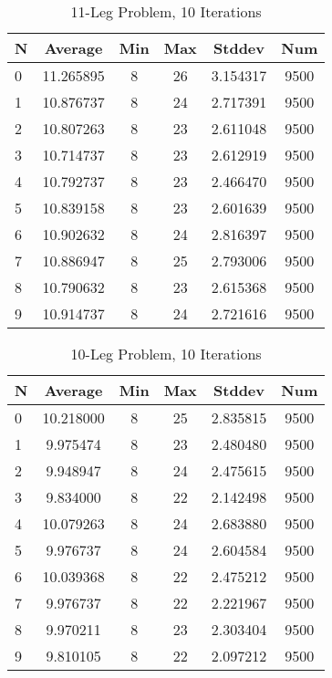 \documentclass{article}
\begin{document}
\begin{table}
\centering
\begin{tabular}{|l|c|c|c|c|c|}
\hline
N & Average & Min & Max & Stddev & Num \\
\hline
0 & 11.265895 & 8 & 26 & 3.154317 & 9500 \\ 
1 & 10.876737 & 8 & 24 & 2.717391 & 9500 \\ 
2 & 10.807263 & 8 & 23 & 2.611048 & 9500 \\ 
3 & 10.714737 & 8 & 23 & 2.612919 & 9500 \\ 
4 & 10.792737 & 8 & 23 & 2.466470 & 9500 \\ 
5 & 10.839158 & 8 & 23 & 2.601639 & 9500 \\ 
6 & 10.902632 & 8 & 24 & 2.816397 & 9500 \\ 
7 & 10.886947 & 8 & 25 & 2.793006 & 9500 \\ 
8 & 10.790632 & 8 & 23 & 2.615368 & 9500 \\ 
9 & 10.914737 & 8 & 24 & 2.721616 & 9500 \\ 
\hline
\end{tabular}
\caption{11-Leg Problem, 10 Iterations}
\label{tab:template}
\end{table}

\begin{table}
\centering
\begin{tabular}{|l|c|c|c|c|c|}
\hline
N & Average & Min & Max & Stddev & Num \\
\hline
0 & 10.218000 & 8 & 25 & 2.835815 & 9500 \\ 
1 & 9.975474 & 8 & 23 & 2.480480 & 9500 \\ 
2 & 9.948947 & 8 & 24 & 2.475615 & 9500 \\ 
3 & 9.834000 & 8 & 22 & 2.142498 & 9500 \\ 
4 & 10.079263 & 8 & 24 & 2.683880 & 9500 \\ 
5 & 9.976737 & 8 & 24 & 2.604584 & 9500 \\ 
6 & 10.039368 & 8 & 22 & 2.475212 & 9500 \\ 
7 & 9.976737 & 8 & 22 & 2.221967 & 9500 \\ 
8 & 9.970211 & 8 & 23 & 2.303404 & 9500 \\ 
9 & 9.810105 & 8 & 22 & 2.097212 & 9500 \\ 
\hline
\end{tabular}
\caption{10-Leg Problem, 10 Iterations}
\label{tab:template}
\end{table}
\end{document}
